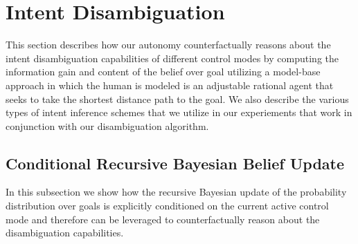 \documentclass[conference]{IEEEtran}
\begin{document}
\section{Intent Disambiguation}\label{sec:disamb}
This section describes how our autonomy counterfactually reasons about the intent disambiguation capabilities of different control modes by computing the information gain and content of the belief over goal utilizing a model-base approach in which the human is modeled is an adjustable rational agent that seeks to take the shortest distance path to the goal. 
We also describe the various types of intent inference schemes that we utilize in our experiements that work in conjunction with our disambiguation algorithm. 


\subsection{Conditional Recursive Bayesian Belief Update}

In this subsection we show how the recursive Bayesian update of the probability distribution over goals is explicitly conditioned on the current active control mode and therefore can be leveraged to counterfactually reason about the disambiguation capabilities. 
\end{document}
